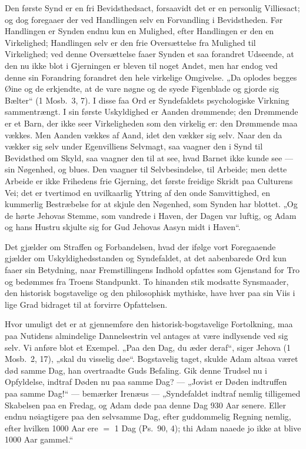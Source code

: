 \documentclass[12pt]{book}
\begin{document}
Den første Synd er en fri Bevidsthedsact, forsaavidt det er en
personlig Villiesact; og dog foregaaer der ved Handlingen selv en
Forvandling i Bevidstheden. Før Handlingen er Synden endnu kun en
Mulighed, efter Handlingen er den en Virkelighed; Handlingen selv er
den frie Oversættelse fra Mulighed til Virkelighed; ved denne
Oversættelse faaer Synden et saa forandret Udseende, at den nu ikke
blot i Gjerningen er bleven til noget Andet, men har endog ved denne
sin Forandring forandret den hele virkelige Omgivelse. „Da oplodes
begges Øine og de erkjendte, at de vare nøgne og de syede Figenblade
og gjorde sig Bælter“ (1 Mosb.\ 3, 7). I disse faa Ord er
Syndefaldets psychologiske Virkning sammentrængt. I sin første
Uskyldighed er Aanden drømmende; den Drømmende er et Barn, der ikke
seer Virkeligheden som den virkelig er: den Drømmende maa vækkes.
Men Aanden vækkes af Aand, idet den vækker sig selv. Naar den da
vækker sig selv under Egenvilliens Selvmagt, saa vaagner den i Synd
til Bevidsthed om Skyld, saa vaagner den til at see, hvad Barnet
ikke kunde see --- sin Nøgenhed, og blues. Den vaagner til
Selvbesindelse, til Arbeide; men dette Arbeide er ikke Frihedens
frie Gjerning, det første freidige Skridt paa Culturens Vei; det er
tvertimod en uvilkaarlig Yttring af den onde Samvittighed, en
kummerlig Bestræbelse for at skjule den Nøgenhed, som Synden har
blottet. „Og de hørte Jehovas
Stemme, som vandrede i Haven, der Dagen var luftig, og Adam og hans
Hustru skjulte sig for Gud Jehovas Aasyn midt i Haven“.

Det gjælder om Straffen og Forbandelsen, hvad der ifølge vort
Foregaaende gjælder om Uskyldighedsstanden og Syndefaldet, at det
aabenbarede Ord kun faaer sin Betydning, naar Fremstillingens
Indhold opfattes som Gjenstand for Tro og bedømmes fra Troens
Standpunkt. To hinanden stik modsatte Synsmaader, den historisk
bogstavelige og den philosophisk mythiske, have hver paa sin Viis i
lige Grad bidraget til at forvirre Opfattelsen.

Hvor umuligt det er at gjennemføre den historisk-bogstavelige
Fortolkning, maa paa Nutidens almindelige Dannelsestrin vel antages
at være indlysende ved sig selv. Vi anføre blot et Exempel. „Paa den
Dag, du æder deraf“, siger Jehova (1 Mosb.\ 2, 17), „skal du visselig
døe“. Bogstavelig taget, skulde Adam altsaa været død samme Dag, han
overtraadte Guds Befaling. Gik denne Trudsel nu i Opfyldelse,
indtraf Døden nu paa samme Dag? --- „Jovist er Døden indtruffen paa
samme Dag!“ --- bemærker Irenæus --- „Syndefaldet indtraf nemlig
tilligemed Skabelsen paa en Fredag, og Adam døde paa denne Dag 930
Aar senere. Eller endnu nøiagtigere paa den selvsamme Dag, efter
guddommelig Regning nemlig, efter hvilken 1000 Aar ere $=$ 1 Dag
(Ps.\ 90, 4); thi Adam naaede jo ikke at blive 1000 Aar gammel.“
\end{document}
